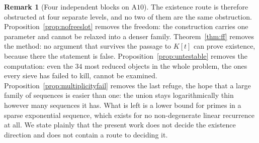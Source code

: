 \documentclass[11pt]{article}
\theoremstyle{definition}
\newtheorem{remark}[theorem]{Remark}
\begin{document}
\begin{remark}[Four independent blocks on $\mathrm{A}10$]\label{rem:threeblocks}
The existence route is therefore obstructed at four separate levels, and no two of them are the
same obstruction. Proposition~\ref{prop:nofreeslot} removes the freedom: the construction carries
one parameter and cannot be relaxed into a denser family. Theorem~\ref{thm:ff} removes the
method: no argument that survives the passage to $K[t]$ can prove existence, because there the
statement is false. Proposition~\ref{prop:untestable} removes the computation: even the $34$ most
reduced objects in the whole problem, the ones every sieve has failed to kill, cannot be examined.
Proposition~\ref{prop:multiplicityfail} removes the last refuge, the hope that a large family of
sequences is easier than one: the union stays logarithmically thin however many sequences it has.
What is left is a lower bound for primes in a sparse exponential sequence, which exists for no
non-degenerate linear recurrence at all. We state plainly that the present work does not decide the
existence direction and does not contain a route to deciding it.
\end{remark}
\end{document}
